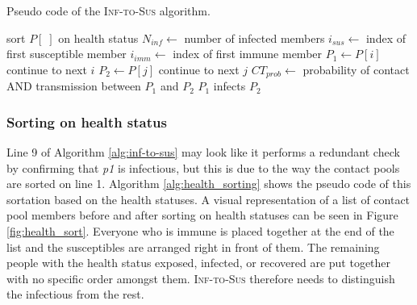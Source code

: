 \begin{algorithm}
\caption{Pseudo code of the \textsc{Inf-to-Sus} algorithm.}
\label{alg:inf-to-sus}
\begin{algorithmic}[1]
    \;
    \Statex
    \State sort $P[\;]$ on health status 
    \Statex
    \State $N_{inf} \gets$ number of infected members
        \State \Return
    \EndIf
    \Statex
    \State $i_{sus} \gets$ index of first susceptible member
    \State $i_{imm} \gets$ index of first immune member
    \Statex
        \State $P_{1} \gets P[i]$
            \State continue to next $i$
        \EndIf
            \State $P_{2} \gets P[j]$
                \State continue to next $j$
            \EndIf
            \State $CT_{prob} \gets$ probability of contact AND transmission between $P_{1}$ and $P_{2}$
                \State $P_{1}$ infects $P_{2}$
            \EndIf
        \EndFor
    \EndFor
\end{algorithmic}
\end{algorithm}

\subsubsection{Sorting on health status}
Line 9 of Algorithm \ref{alg:inf-to-sus} may look like it performs a redundant check by confirming that \textit{p1} is infectious, but this is due to the way the contact pools are sorted on line 1. Algorithm \ref{alg:health_sorting} shows the pseudo code of this sortation based on the health statuses. A visual representation of a list of contact pool members before and after sorting on health statuses can be seen in Figure \ref{fig:health_sort}. Everyone who is immune is placed together at the end of the list and the susceptibles are arranged right in front of them. The remaining people with the health status exposed, infected, or recovered are put together with no specific order amongst them. \textsc{Inf-to-Sus} therefore needs to distinguish the infectious from the rest.


